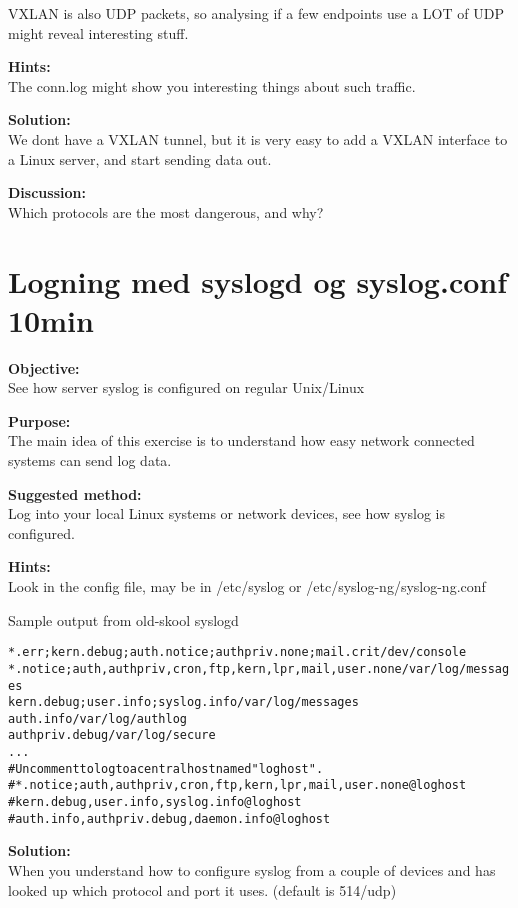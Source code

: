 \documentclass[a4paper,11pt,notitlepage]{report}
\begin{document}
VXLAN is also UDP packets, so analysing if a few endpoints use a LOT of UDP might reveal interesting stuff.


{\bf Hints:}\\
The conn.log might show you interesting things about such traffic.


{\bf Solution:}\\
We dont have a VXLAN tunnel, but it is very easy to add a VXLAN interface to a Linux server, and start sending data out.


{\bf Discussion:}\\
Which protocols are the most dangerous, and why?


\chapter{Logning med syslogd og syslog.conf 10min}
\label{ex:syslogd-basic}

{\bf Objective:} \\
See how server syslog is configured on regular Unix/Linux

{\bf Purpose:}\\
The main idea of this exercise is to understand how easy network connected systems can send log data.


{\bf Suggested method:}\\
Log into your local Linux systems or network devices, see how syslog is configured.

{\bf Hints:}\\
Look in the config file, may be in /etc/syslog  or /etc/syslog-ng/syslog-ng.conf

Sample output from old-skool syslogd
\begin{alltt}
\small
*.err;kern.debug;auth.notice;authpriv.none;mail.crit    /dev/console
*.notice;auth,authpriv,cron,ftp,kern,lpr,mail,user.none /var/log/messages
kern.debug;user.info;syslog.info                        /var/log/messages
auth.info                                               /var/log/authlog
authpriv.debug                                          /var/log/secure
...
# Uncomment to log to a central host named "loghost".
#*.notice;auth,authpriv,cron,ftp,kern,lpr,mail,user.none        @loghost
#kern.debug,user.info,syslog.info                               @loghost
#auth.info,authpriv.debug,daemon.info                           @loghost
\end{alltt}

{\bf Solution:}\\
When you understand how to configure syslog from a couple of devices and has looked up which protocol and port it uses. (default is 514/udp)
\end{document}
